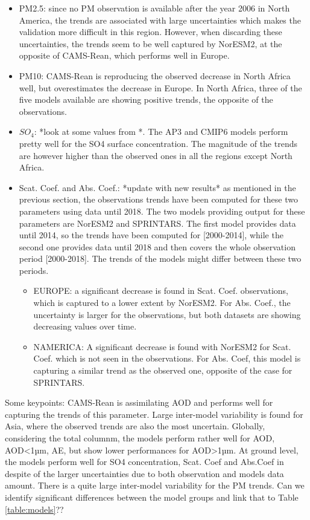 \documentclass[journal abbreviation, manuscript]{copernicus}
\begin{document}
\begin{itemize}
\begin{itemize}
       \end{itemize}
 \item PM2.5: since no PM observation is available after the year 2006 in North America, the trends are associated with large uncertainties which makes the validation more difficult in this region. However, when discarding these uncertainties, the trends seem to be well captured by NorESM2, at the opposite of CAMS-Rean, which performs well in Europe.
 \item PM10: CAMS-Rean is reproducing the observed decrease in North Africa well, but overestimates the decrease in Europe. In North Africa, three of the five models available are showing positive trends, the opposite of the observations.
 \item $SO_{4}$: *look at some values from \cite{aas2019global}*. The AP3 and CMIP6 models perform pretty well for the SO4 surface concentration. The magnitude of the trends are however higher than the observed ones in all the regions except North Africa.
 \item Scat. Coef. and Abs. Coef.: *update with new results* as mentioned in the previous section, the observations trends have been computed for these two parameters using data until 2018. The two models providing output for these parameters are NorESM2 and SPRINTARS. The first model provides data until 2014, so the trends have been computed for [2000-2014], while the second one provides data until 2018 and then covers the whole observation period [2000-2018]. The trends of the models might differ between these two periods.
       \begin{itemize}
        \item EUROPE: a significant decrease is found in Scat. Coef. observations, which is captured to a lower extent by NorESM2. For Abs. Coef., the uncertainty is larger for the observations, but both datasets are showing decreasing values over time.
        \item NAMERICA: A significant decrease is found with NorESM2 for Scat. Coef. which is not seen in the observations. For Abs. Coef, this model is capturing a similar trend as the observed one, opposite of the case for SPRINTARS.
       \end{itemize}
\end{itemize}

Some keypoints:
CAMS-Rean is assimilating AOD and performs well for capturing the trends of this parameter.
Large inter-model variability is found for Asia, where the observed trends are also the most uncertain.
Globally, considering the total columnm, the models perform rather well for AOD, AOD<1µm, AE, but show lower performances for AOD>1µm. At ground level, the models perform well for SO4 concentration, Scat. Coef and Abs.Coef in despite of the larger uncertainties due to both observation and models data amount. There is a quite large inter-model variability for the PM trends. Can we identify significant differences between the model groups and link that to Table \ref{table:models}??
\end{document}
